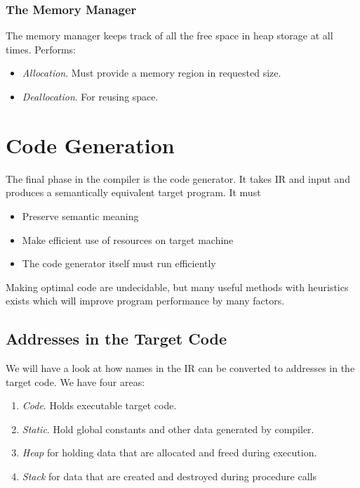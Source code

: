 \documentclass{article}
\begin{document}
\subsubsection{The Memory Manager} %
\label{ssub:The Memory Manager}
The memory manager keeps track of all the free space in heap storage at all times. Performs:
\begin{itemize}
	\item \emph{Allocation}. Must provide a memory region in requested size.
	\item \emph{Deallocation}. For reusing space.
\end{itemize}


\section{Code Generation} %
\label{sec:Code Generation}
The final phase in the compiler is the code generator. It takes IR and input and produces a semantically equivalent target program. It must
\begin{itemize}
	\item Preserve semantic meaning
	\item Make efficient use of resources on target machine
	\item The code generator itself must run efficiently
\end{itemize}
Making optimal code are undecidable, but many useful methods with heuristics exists which will improve program performance by many factors.

\subsection{Addresses in the Target Code} %
\label{sub:Addresses in the Target Code}
We will have a look at how names in the IR can be converted to addresses in the target code. We have four areas:
\begin{enumerate}
	\item \emph{Code}. Holds executable target code.
	\item \emph{Static}. Hold global constants and other data generated by compiler.
	\item \emph{Heap} for holding data that are allocated and freed during execution.
	\item \emph{Stack} for data that are created and destroyed during procedure calls
\end{enumerate}
\end{document}
